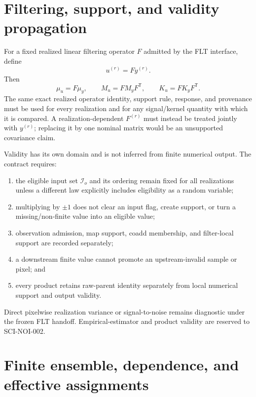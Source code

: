 \documentclass[11pt]{article}
\begin{document}
\section{Filtering, support, and validity propagation}

For a fixed realized linear filtering operator $F$ admitted by the FLT
interface, define
\begin{equation}
  u^{(r)}=Fy^{(r)}.
  \label{eq:fixed-filter}
\end{equation}
Then
\begin{equation}
  \mu_u=F\mu_y,
  \qquad M_u=FM_yF^{\mathsf T},
  \qquad K_u=FK_yF^{\mathsf T}.
  \label{eq:filter-propagation}
\end{equation}
The same exact realized operator identity, support rule, response, and
provenance must be used for every realization and for any signal/kernel
quantity with which it is compared.  A realization-dependent $F^{(r)}$ must
instead be treated jointly with $y^{(r)}$; replacing it by one nominal matrix
would be an unsupported covariance claim.

Validity has its own domain and is not inferred from finite numerical output.
The contract requires:
\begin{enumerate}
\item the eligible input set $\mathcal I_o$ and its ordering remain fixed for
all realizations unless a different law explicitly includes eligibility as a
random variable;
\item multiplying by $\pm1$ does not clear an input flag, create support, or
turn a missing/non-finite value into an eligible value;
\item observation admission, map support, coadd membership, and filter-local
support are recorded separately;
\item a downstream finite value cannot promote an upstream-invalid sample or
pixel; and
\item every product retains raw-parent identity separately from local
numerical support and output validity.
\end{enumerate}
Direct pixelwise realization variance or signal-to-noise remains diagnostic
under the frozen FLT handoff.  Empirical-estimator and product validity are
reserved to SCI-NOI-002.

\section{Finite ensemble, dependence, and effective assignments}
\end{document}
